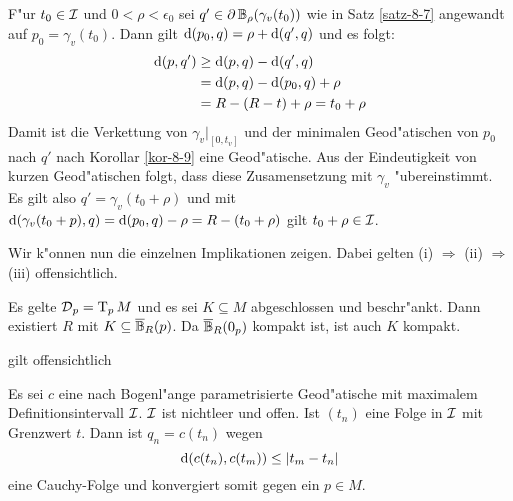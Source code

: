 \begin{bew}
\begin{center}
\end{center}
  F"ur $t_0 \in \calI$ und $0 < \rho < \epsilon_0$ sei $q' \in \partial \B_\rho(\gamma_v(t_0))$ wie in Satz \ref{satz-8-7} angewandt auf $p_0 = \gamma_v(t_0)$. Dann gilt $\dop(p_0, q) = \rho + \dop(q',q)$ und es folgt:
  \begin{align*}
    \dop(p,q') &\ge \dop(p,q) - \dop (q',q)\\
    &= \dop(p,q) - \dop(p_0,q) + \rho\\
    &= R - (R - t) + \rho = t_0 + \rho
  \end{align*}
  Damit ist die Verkettung von $\gamma_v|_{[0,t_v]}$ und der minimalen Geod"atischen von $p_0$ nach $q'$ nach Korollar \ref{kor-8-9} eine Geod"atische.
  Aus der Eindeutigkeit von kurzen Geod"atischen folgt, dass diese Zusamensetzung mit $\gamma_v$ "ubereinstimmt.
  Es gilt also $q' = \gamma_v(t_0 + \rho)$ und mit $\dop(\gamma_v(t_0 + p), q) = \dop(p_0,q) - \rho = R - (t_0 + \rho)$ gilt $t_0 + \rho \in \calI$.

  Wir k"onnen nun die einzelnen Implikationen zeigen.
  Dabei gelten (i) $\Rightarrow$ (ii) $\Rightarrow$ (iii) offensichtlich.
  \begin{description}[font=\normalfont]
  \item[(iii) $\Rightarrow$ (iv):]
    Es gelte $\calD_p = \T_pM$ und es sei $K \subseteq M$ abgeschlossen und beschr"ankt.
    Dann existiert $R$ mit $K \subseteq \overline\B_R(p)$. Da $\overline\B_R(0_p)$ kompakt ist, ist auch $K$ kompakt.
  \item[(iv) $\Rightarrow$ (v):]
    gilt offensichtlich
  \item[(v) $\Rightarrow$ (i):]
    Es sei $c$ eine nach Bogenl"ange parametrisierte Geod"atische mit maximalem Definitionsintervall $\calI$. $\calI$ ist nichtleer und offen.
    Ist $(t_n)$ eine Folge in $\calI$ mit Grenzwert $t$.
    Dann ist $q_n = c(t_n)$ wegen
    \[ \dop(c(t_n), c(t_m)) \le |t_m - t_n| \]
    eine Cauchy-Folge und konvergiert somit gegen ein $p \in M$.
    \begin{center}\begin{tikzpicture}[font=\scriptsize,scale=0.9]
        

\end{tikzpicture}
\end{center}
\end{description}
\end{bew}

